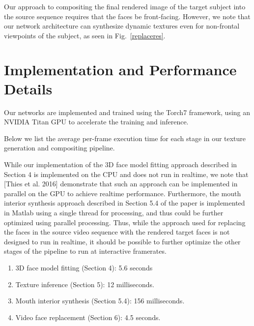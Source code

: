 \documentclass[10pt,twocolumn,letterpaper]{article}
\begin{document}
Our approach to compositing the final rendered image of the target subject into the source sequence requires that the faces be front-facing. However, we note that our network architecture can synthesize dynamic textures even for non-frontal viewpoints of the subject, as seen in Fig.~\ref{replaceres}.


\section{Implementation and Performance Details}

Our networks are implemented and trained using the Torch7 framework, using an NVIDIA Titan GPU to accelerate the training and inference.

Below we list the average per-frame execution time for each stage in our texture generation and compositing pipeline.

While our implementation of the 3D face model fitting approach described in Section 4 is implemented on the CPU and does not run in realtime, we note that [Thies et al. 2016] demonstrate that such an approach can be implemented in parallel on the GPU to achieve realtime performance. Furthermore, the mouth interior synthesis approach described in Section 5.4 of the paper is implemented in Matlab using a single thread for processing, and thus could be further optimized using parallel processing. Thus, while the approach used for replacing the faces in the source video sequence with the rendered target faces is not designed to run in realtime, it should be possible to further optimize the other stages of the pipeline to run at interactive framerates.




\begin{enumerate}
\item 3D face model fitting (Section 4): 5.6 seconds
\item Texture inference (Section 5): 12 milliseconds.
\item Mouth interior synthesis (Section 5.4): 156 milliseconds.
\item Video face replacement (Section 6): 4.5 seconds.
\end{enumerate}
\end{document}
